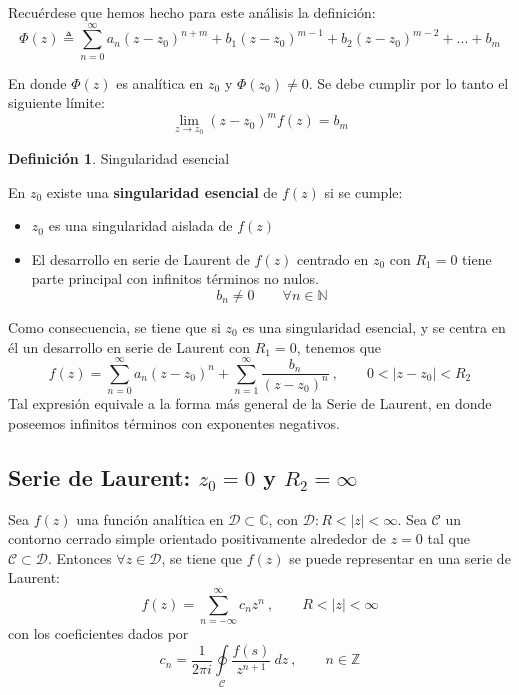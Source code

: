 \documentclass[12pt]{article}
\theoremstyle{definition}
\newtheorem{definition}{Definici\'on}[section]
\theoremstyle{theorem}
\theoremstyle{corolary}
\theoremstyle{method}
\begin{document}
Recu\'erdese que hemos hecho para este an\'alisis la definici\'on: $$\Phi(z)\triangleq\sum\limits_{n=0}^{\infty}a_n(z-z_0)^{n+m}+b_1(z-z_0)^{m-1}+b_2(z-z_0)^{m-2}+...+b_m$$

En donde $\Phi(z)$ es anal\'itica en $z_0$ y $\Phi(z_0)\neq0$.
Se debe cumplir por lo tanto el siguiente l\'imite: $$\lim\limits_{z\rightarrow z_0}(z-z_0)^m f(z)=b_m$$
\linebreak

\colorbox{yellow!40!white!80}{\parbox{\linewidth}{
\theoremstyle{definition}
\begin{definition}{Singularidad esencial}

En $z_0$ existe una \textbf{singularidad esencial} de $f(z)$ si se cumple:
\begin{itemize}
	\item $z_0$ es una singularidad aislada de $f(z)$
	\item El desarrollo en serie de Laurent de $f(z)$ centrado en $z_0$ con $R_1=0$ tiene parte principal con infinitos t\'erminos no nulos. $$b_n\neq 0 \qquad \forall n \in \mathbb{N}$$
\end{itemize}
\end{definition}}}
\linebreak
\linebreak

Como consecuencia, se tiene que si $z_0$ es una singularidad esencial, y se centra en \'el un desarrollo en serie de Laurent con $R_1=0$, tenemos que $$f(z)=\sum\limits_{n=0}^{\infty}a_n(z-z_0)^n + \sum\limits_{n=1}^{\infty}\frac{b_n}{(z-z_0)^n} \ , \qquad 0<|z-z_0|<R_2$$
Tal expresi\'on equivale a la forma m\'as general de la Serie de Laurent, en donde poseemos infinitos t\'erminos con exponentes negativos.

\subsection{Serie de Laurent: $z_0=0$ y $R_2=\infty$}
Sea $f(z)$ una funci\'on anal\'itica en $\mathcal{D}\subset \mathbb{C}$, con $\mathcal{D}: R<|z|<\infty$. Sea $\mathcal{C}$ un contorno cerrado simple orientado positivamente alrededor de $z=0$ tal que $\mathcal{C}\subset \mathcal{D}$. Entonces $\forall z\in \mathcal{D}$, se tiene que $f(z)$ se puede representar en una serie de Laurent:
$$f(z)=\sum\limits_{n=-\infty}^{\infty} c_n z^n\ ,\qquad R<|z|<\infty$$
con los coeficientes dados por $$c_n =\frac{1}{2\pi i} \oint\limits_{\mathcal{C}}\frac{f(s)}{z^{n+1}}\ dz\ ,\qquad n\in \mathbb{Z}$$
\end{document}
